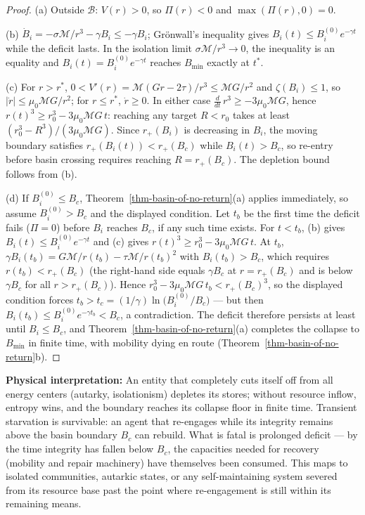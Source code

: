 \documentclass[11pt]{article}
\theoremstyle{plain}
\theoremstyle{definition}
\theoremstyle{remark}
\begin{document}
\begin{proof}
(a) Outside $\mathcal{B}$: $V(r) > 0$, so $\Pi(r) < 0$ and $\max(\Pi(r), 0) = 0$.

(b) $\dot{B}_i = -\sigma\mathcal{M}/r^3 - \gamma B_i \leq -\gamma B_i$; Grönwall's inequality gives $B_i(t) \leq B_i^{(0)} e^{-\gamma t}$ while the deficit lasts. In the isolation limit $\sigma\mathcal{M}/r^3 \to 0$, the inequality is an equality and $B_i(t) = B_i^{(0)} e^{-\gamma t}$ reaches $B_{\min}$ exactly at $t^*$.

(c) For $r > r^*$, $0 < V'(r) = \mathcal{M}(Gr - 2\tau)/r^3 \leq \mathcal{M}G/r^2$ and $\zeta(B_i) \leq 1$, so $|\dot{r}| \leq \mu_0\mathcal{M}G/r^2$; for $r \leq r^*$, $\dot{r} \geq 0$. In either case $\frac{d}{dt}\,r^3 \geq -3\mu_0\mathcal{M}G$, hence $r(t)^3 \geq r_0^3 - 3\mu_0\mathcal{M}G\,t$: reaching any target $R < r_0$ takes at least $(r_0^3 - R^3)/(3\mu_0\mathcal{M}G)$. Since $r_+(B_i)$ is decreasing in $B_i$, the moving boundary satisfies $r_+(B_i(t)) < r_+(B_c)$ while $B_i(t) > B_c$, so re-entry before basin crossing requires reaching $R = r_+(B_c)$. The depletion bound follows from (b).

(d) If $B_i^{(0)} \leq B_c$, Theorem~\ref{thm-basin-of-no-return}(a) applies immediately, so assume $B_i^{(0)} > B_c$ and the displayed condition. Let $t_b$ be the first time the deficit fails ($\Pi = 0$) before $B_i$ reaches $B_c$, if any such time exists. For $t < t_b$, (b) gives $B_i(t) \leq B_i^{(0)} e^{-\gamma t}$ and (c) gives $r(t)^3 \geq r_0^3 - 3\mu_0\mathcal{M}G\,t$. At $t_b$, $\gamma B_i(t_b) = G\mathcal{M}/r(t_b) - \tau\mathcal{M}/r(t_b)^2$ with $B_i(t_b) > B_c$, which requires $r(t_b) < r_+(B_c)$ (the right-hand side equals $\gamma B_c$ at $r = r_+(B_c)$ and is below $\gamma B_c$ for all $r > r_+(B_c)$). Hence $r_0^3 - 3\mu_0\mathcal{M}G\,t_b < r_+(B_c)^3$, so the displayed condition forces $t_b > t_c = (1/\gamma)\ln\bigl(B_i^{(0)}/B_c\bigr)$ — but then $B_i(t_b) \leq B_i^{(0)} e^{-\gamma t_b} < B_c$, a contradiction. The deficit therefore persists at least until $B_i \leq B_c$, and Theorem~\ref{thm-basin-of-no-return}(a) completes the collapse to $B_{\min}$ in finite time, with mobility dying en route (Theorem~\ref{thm-basin-of-no-return}b).
\end{proof}

\textbf{Physical interpretation:} An entity that completely cuts itself
off from all energy centers (autarky, isolationism) depletes its stores;
without resource inflow, entropy wins, and the boundary reaches its
collapse floor in finite time. Transient starvation is survivable: an
agent that re-engages while its integrity remains above the basin
boundary \(B_c\) can rebuild. What is fatal is prolonged deficit --- by
the time integrity has fallen below \(B_c\), the capacities needed for
recovery (mobility and repair machinery) have themselves been consumed.
This maps to isolated communities, autarkic states, or any
self-maintaining system severed from its resource base past the point
where re-engagement is still within its remaining means.
\end{document}
